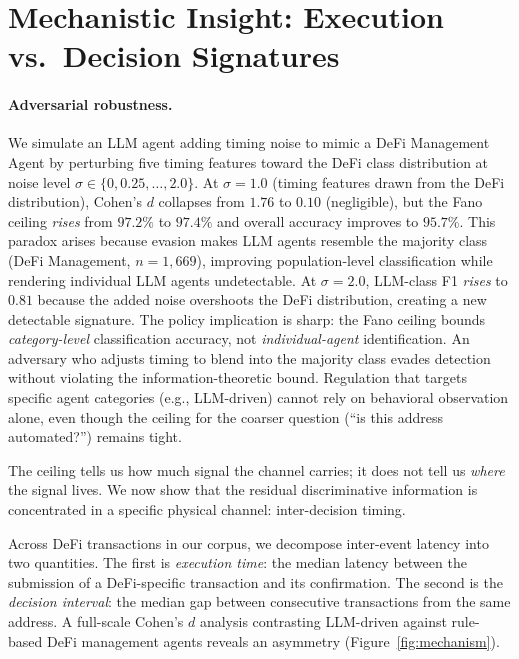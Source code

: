\documentclass[11pt,a4paper]{article}
\begin{document}
\section*{Mechanistic Insight: Execution vs.\ Decision Signatures}

\paragraph{Adversarial robustness.}
We simulate an LLM agent adding timing noise to mimic a DeFi Management
Agent by perturbing five timing features toward the DeFi class distribution
at noise level $\sigma \in \{0, 0.25, \ldots, 2.0\}$.
At $\sigma = 1.0$ (timing features drawn from the DeFi distribution),
Cohen's $d$ collapses from $1.76$ to $0.10$ (negligible), but the Fano
ceiling \emph{rises} from $97.2\%$ to $97.4\%$ and overall accuracy
improves to $95.7\%$. This paradox arises because evasion makes LLM
agents resemble the majority class (DeFi Management, $n = 1{,}669$),
improving population-level classification while rendering individual
LLM agents undetectable. At $\sigma = 2.0$, LLM-class F1 \emph{rises}
to $0.81$ because the added noise overshoots the DeFi distribution,
creating a new detectable signature.
The policy implication is sharp: the Fano ceiling bounds
\emph{category-level} classification accuracy, not \emph{individual-agent}
identification. An adversary who adjusts timing to blend into the majority
class evades detection without violating the information-theoretic bound.
Regulation that targets specific agent categories (e.g., LLM-driven)
cannot rely on behavioral observation alone, even though the ceiling
for the coarser question (``is this address automated?'') remains tight.

The ceiling tells us how much signal the channel carries; it does not tell
us \emph{where} the signal lives. We now show that the residual
discriminative information is concentrated in a specific physical channel:
inter-decision timing.

Across \rtTotalDefiTxs{} DeFi transactions in our corpus, we decompose inter-event
latency into two quantities. The first is \emph{execution time}: the
median latency between the submission of a DeFi-specific transaction and
its confirmation. The second is the \emph{decision interval}: the median
gap between consecutive transactions from the same address. A full-scale
Cohen's $d$ analysis contrasting LLM-driven against rule-based DeFi
management agents reveals an asymmetry
(Figure~\ref{fig:mechanism}).
\end{document}

